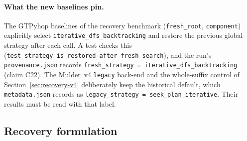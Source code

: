 \paragraph{What the new baselines pin.} The GTPyhop baselines of the recovery benchmark
(\texttt{fresh\_root}, \texttt{component}) explicitly select \texttt{iterative\_dfs\_backtracking} and
restore the previous global strategy after each call. A test checks this
(\texttt{test\_strategy\_is\_restored\_after\_fresh\_search}), and the run's \texttt{provenance.json}
records \texttt{fresh\_strategy = iterative\_dfs\_backtracking} (claim C22). The Mulder~v4
\texttt{legacy} back-end and the whole-suffix control of Section~\ref{sec:recovery-v4} deliberately keep
the historical default, which \texttt{metadata.json} records as \texttt{legacy\_strategy =
seek\_plan\_iterative}. Their results must be read with that label.

\subsection{Recovery formulation}
\label{sec:recovery-formulation}

